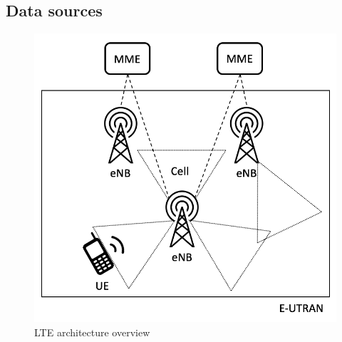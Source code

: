 \documentclass{beamer}
\begin{document}
\subsection{Data sources}
\begin{frame}
\begin{figure}
	\includegraphics[width=0.6\linewidth]{LTE}
	\caption{LTE architecture overview}
\end{figure}
\end{frame}
\end{document}
